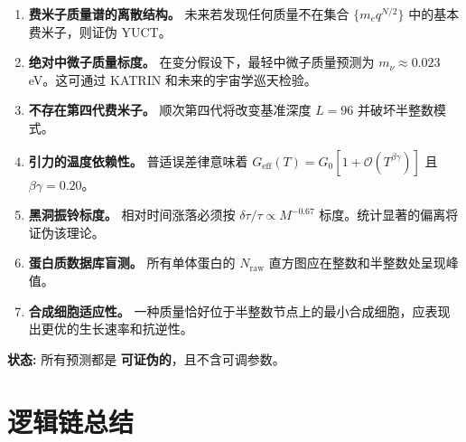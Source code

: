 \documentclass[12pt,a4paper]{article}
\begin{document}
	\begin{enumerate}
		\item \textbf{费米子质量谱的离散结构。} 未来若发现任何质量不在集合 \(\{m_e q^{N/2}\}\) 中的基本费米子，则证伪 YUCT。
		\item \textbf{绝对中微子质量标度。} 在变分假设下，最轻中微子质量预测为 \(m_{\nu} \approx 0.023\) eV。这可通过 KATRIN 和未来的宇宙学巡天检验。
		\item \textbf{不存在第四代费米子。} 顺次第四代将改变基准深度 \(L = 96\) 并破坏半整数模式。
		\item \textbf{引力的温度依赖性。} 普适误差律意味着 \(G_{\mathrm{eff}}(T) = G_0[1 + \mathcal{O}(T^{\beta\gamma})]\) 且 \(\beta\gamma = 0.20\)。
		\item \textbf{黑洞振铃标度。} 相对时间涨落必须按 \(\delta\tau/\tau \propto M^{-0.67}\) 标度。统计显著的偏离将证伪该理论。
		\item \textbf{蛋白质数据库盲测。} 所有单体蛋白的 \(N_{\mathrm{raw}}\) 直方图应在整数和半整数处呈现峰值。
		\item \textbf{合成细胞适应性。} 一种质量恰好位于半整数节点上的最小合成细胞，应表现出更优的生长速率和抗逆性。
	\end{enumerate}
	
	\textbf{状态:} 所有预测都是 \textbf{可证伪的}，且不含可调参数。
	
	\section*{逻辑链总结}
	
\end{document}
